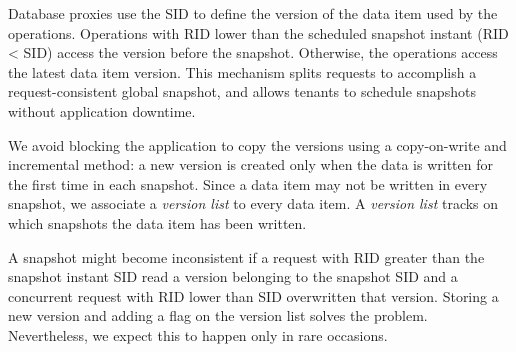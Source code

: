 Database proxies use the \ac{SID} to define the version of the data item used by the operations. Operations with \acf{RID} lower than the scheduled snapshot instant (\ac{RID} < \ac{SID}) access the version before the snapshot. Otherwise, the operations access the latest data item version. This mechanism splits requests to accomplish a request-consistent global snapshot, and allows tenants to schedule snapshots without application downtime. 

We avoid blocking the application to copy the versions using a copy-on-write and incremental method: a new version is created only when the data is written for the first time in each snapshot. Since a data item may not be written in every snapshot, we associate a \emph{version list} to every data item. A \emph{version list} tracks on which snapshots the data item has been written.

A snapshot might become inconsistent if a request with \ac{RID} greater than the snapshot instant \ac{SID} read a version belonging to the snapshot \ac{SID} and a concurrent request with \ac{RID} lower than \ac{SID} overwritten that version. Storing a new version and adding a flag on the version list solves the problem. Nevertheless, we expect this to happen only in rare occasions.




